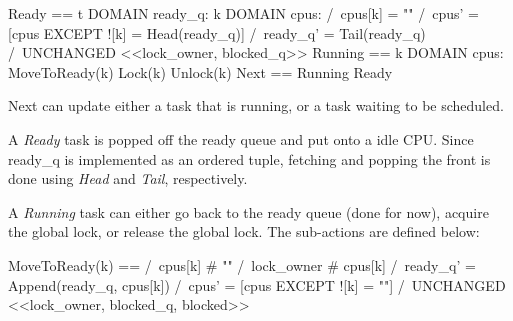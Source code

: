 \begin{tla}
Ready == 
    \E t \in DOMAIN ready_q:
        \E k \in DOMAIN cpus:
        /\ cpus[k] = "" 
        /\ cpus' = [cpus EXCEPT ![k] = Head(ready_q)]
        /\ ready_q' = Tail(ready_q)
        /\ UNCHANGED <<lock_owner, blocked_q>>
Running == 
    \E k \in DOMAIN cpus:
        \/ MoveToReady(k)
        \/ Lock(k)
        \/ Unlock(k)
Next == 
    \/ Running
    \/ Ready
\end{tla}
\begin{tlatex}
%
%
%
%
%
%
%
%
%
%
%
%
%
\end{tlatex}

Next can update either a task that is running, or a task waiting to be
scheduled.\newline

A \textit{Ready} task is popped off the ready queue and put onto a idle CPU.
Since ready\_q is implemented as an ordered tuple, fetching and popping the
front is done using \textit{Head} and \textit{Tail}, respectively.\newline

A \textit{Running} task can either go back to the ready queue (done for now),
acquire the global lock, or release the global lock.  The sub-actions are
defined below:\newline

\begin{tla}
MoveToReady(k) == 
    /\ cpus[k] # "" 
    /\ lock_owner # cpus[k]
    /\ ready_q' = Append(ready_q, cpus[k]) 
    /\ cpus' = [cpus EXCEPT ![k] = ""]
    /\ UNCHANGED <<lock_owner, blocked_q, blocked>>
\end{tla}
\begin{tlatex}
%
%
%
\end{tlatex}
\newline

